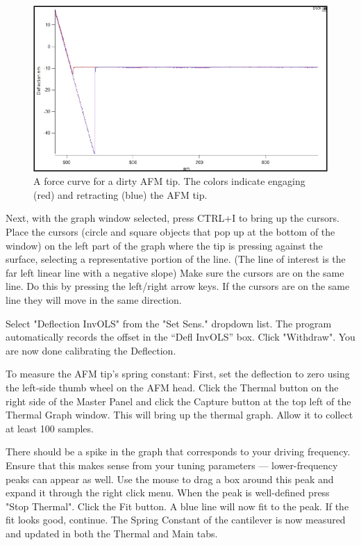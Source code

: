 \documentclass[double,12pt,1in]{beavtex}
\begin{document}
\begin{figure}
    \includegraphics{force curve.pdf}
    \caption{A force curve for a dirty AFM tip. The colors indicate engaging (red) and retracting (blue) the AFM tip.}
    \label{force curve}
\end{figure}

Next, with the graph window selected, press CTRL+I to bring up the cursors. Place the cursors (circle and square objects that pop up at the bottom of the window) on the left part of the graph where the tip is pressing against the surface, selecting a representative portion of the line. (The line of interest is the far left linear line with a negative slope) Make sure the cursors are on the same line. Do this by pressing the left/right arrow keys. If the cursors are on the same line they will move in the same direction.

Select "Deflection InvOLS" from the "Set Sens." dropdown list. The program automatically records the offset in the “Defl InvOLS” box. Click "Withdraw". You are now done calibrating the Deflection.
   
To measure the AFM tip's spring constant: First, set the deflection to zero using the left-side thumb wheel on the AFM head. Click the Thermal button on the right side of the Master Panel and click the Capture button at the top left of the Thermal Graph window. This will bring up the thermal graph. Allow it to collect at least 100 samples.

There should be a spike in the graph that corresponds to your driving frequency. Ensure that this makes sense from your tuning parameters — lower-frequency peaks can appear as well. Use the mouse to drag a box around this peak and expand it through the right click menu. When the peak is well-defined press "Stop Thermal". Click the Fit button. A blue line will now fit to the peak. If the fit looks good, continue. The Spring Constant of the cantilever is now measured and updated in both the Thermal and Main tabs.
\end{document}
